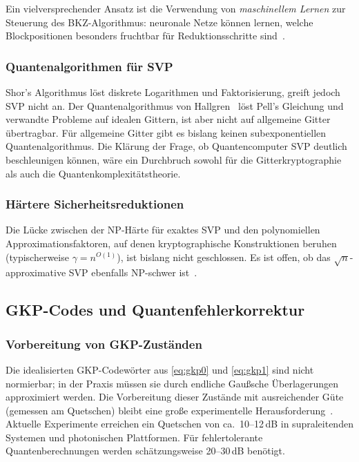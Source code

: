 ﻿\documentclass[a4paper,12pt]{article}
\theoremstyle{definition}
\begin{document}
Ein vielversprechender Ansatz ist die Verwendung von \emph{maschinellem Lernen}
zur Steuerung des BKZ-Algorithmus: neuronale Netze können lernen, welche
Blockpositionen besonders fruchtbar für Reduktionsschritte sind~\cite{Novaes2023}.

\subsubsection{Quantenalgorithmen für SVP}

Shor's Algorithmus löst diskrete Logarithmen und Faktorisierung,
greift jedoch SVP nicht an.
Der Quantenalgorithmus von Hallgren~\cite{Hallgren2007} löst Pell's Gleichung
und verwandte Probleme auf idealen Gittern, ist aber nicht auf allgemeine Gitter übertragbar.
Für allgemeine Gitter gibt es bislang keinen subexponentiellen Quantenalgorithmus.
Die Klärung der Frage, ob Quantencomputer SVP deutlich beschleunigen können,
wäre ein Durchbruch sowohl für die Gitterkryptographie als auch die Quantenkomplexitätstheorie.

\subsubsection{Härtere Sicherheitsreduktionen}

Die Lücke zwischen der NP-Härte für exaktes SVP und den polynomiellen Approximationsfaktoren,
auf denen kryptographische Konstruktionen beruhen (typischerweise $\gamma = n^{O(1)}$),
ist bislang nicht geschlossen.
Es ist offen, ob das $\sqrt{n}$-approximative SVP ebenfalls NP-schwer ist~\cite{Khot2005}.

\subsection{GKP-Codes und Quantenfehlerkorrektur}

\subsubsection{Vorbereitung von GKP-Zuständen}

Die idealisierten GKP-Codewörter aus \eqref{eq:gkp0} und \eqref{eq:gkp1}
sind nicht normierbar; in der Praxis müssen sie durch endliche
Gaußsche Überlagerungen approximiert werden.
Die Vorbereitung dieser Zustände mit ausreichender Güte
(gemessen am Quetschen) bleibt eine große experimentelle Herausforderung~\cite{Campagne2020}.
Aktuelle Experimente erreichen ein Quetschen von ca.~10--12\,dB in supraleitenden
Systemen und photonischen Plattformen.
Für fehlertolerante Quantenberechnungen werden schätzungsweise 20--30\,dB benötigt.
\end{document}
